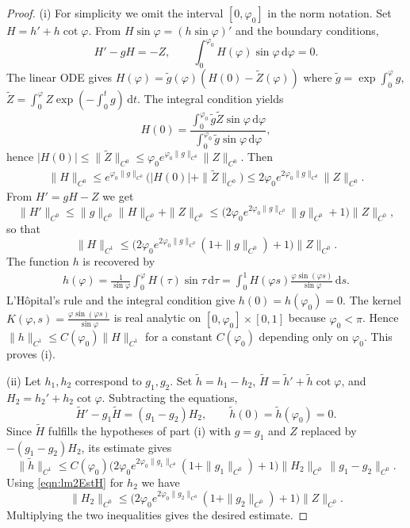 \documentclass{amsart}
\newcommand{\rmd}{\mathrm{d}}
\begin{document}
\begin{proof}
(i) For simplicity we omit the interval $[0,\varphi_0]$ in the norm notation.
Set $H = h' + h\cot\varphi$.  From $H\sin\varphi = (h\sin\varphi)'$ and the boundary conditions,
\[
H' - gH = -Z,\qquad \int_0^{\varphi_0} H(\varphi)\sin\varphi\,\mathrm{d}\varphi = 0.
\]
The linear ODE gives $H(\varphi) = \tilde g(\varphi)(H(0) - \tilde Z(\varphi))$ where
$\tilde g = \exp\int_0^\varphi g$, $\tilde Z = \int_0^\varphi Z\exp(-\int_0^t g)\,\rmd t$.
The integral condition yields
\[
H(0) = \frac{\int_0^{\varphi_0}\tilde g \tilde Z \sin\varphi\,\mathrm{d}\varphi}
            {\int_0^{\varphi_0}\tilde g \sin\varphi\,\mathrm{d}\varphi},
\]
hence $|H(0)| \le \|\tilde Z\|_{C^0} \le \varphi_0 e^{\varphi_0\|g\|_{C^0}}\|Z\|_{C^0}$.
Then
\begin{align}\label{eqn:lm2EstH}
\|H\|_{C^0} \le e^{\varphi_0\|g\|_{C^0}}\bigl(|H(0)|+\|\tilde Z\|_{C^0}\bigr)
          \le 2\varphi_0 e^{2\varphi_0\|g\|_{C^0}}\|Z\|_{C^0}.
\end{align}
From $H' = gH - Z$ we get
\[
\|H'\|_{C^0} \le \|g\|_{C^0}\|H\|_{C^0} + \|Z\|_{C^0}
\le \bigl(2\varphi_0 e^{2\varphi_0\|g\|_{C^0}}\|g\|_{C^0} + 1\bigr)\|Z\|_{C^0},
\]
so that
\[
\|H\|_{C^1} \le \bigl(2\varphi_0 e^{2\varphi_0\|g\|_{C^0}}(1+\|g\|_{C^0}) + 1\bigr)\|Z\|_{C^0}.
\]
The function $h$ is recovered by
\begin{align}\label{eqn:BVPKernel}
h(\varphi) = \frac{1}{\sin\varphi}\int_0^\varphi H(\tau)\sin\tau\,\rmd\tau
= \int_0^1 H(\varphi s)\frac{\varphi\sin(\varphi s)}{\sin\varphi}\,\rmd s.
\end{align}
L'H\^opital's rule and the integral condition give $h(0)=h(\varphi_0)=0$.
The kernel $K(\varphi,s)=\frac{\varphi\sin(\varphi s)}{\sin\varphi}$ is real analytic on $[0,\varphi_0]\times[0,1]$ because $\varphi_0<\pi$. Hence $\|h\|_{C^{1}}\le C(\varphi_{0})\|H\|_{C^{1}}$ for a constant $C(\varphi_{0})$ depending only on $\varphi_{0}$. This proves (i).

\noindent(ii) Let $h_1,h_2$ correspond to $g_1,g_2$.  Set $\tilde h = h_1-h_2$, $\tilde H = \tilde h'+\tilde h\cot\varphi$, and $H_2 = h_2'+h_2\cot\varphi$.  Subtracting the equations,
\[
\tilde H' - g_1\tilde H = (g_1-g_2)H_2,\qquad \tilde h(0)=\tilde h(\varphi_0)=0.
\]
Since $\tilde H$ fulfills the hypotheses of part (i) with $g=g_1$ and $Z$ replaced by $-(g_1-g_2)H_2$, its estimate gives
\[
\|\tilde h\|_{C^1} \le C(\varphi_0)\bigl(2\varphi_0 e^{2\varphi_0\|g_1\|_{C^0}}(1+\|g_1\|_{C^0}) + 1\bigr)
   \|H_2\|_{C^0}\,\|g_1-g_2\|_{C^0}.
\]
Using \eqref{eqn:lm2EstH} for $h_{2}$ we have
\[
\|H_2\|_{C^0} \le \bigl(2\varphi_0 e^{2\varphi_0\|g_2\|_{C^0}}(1+\|g_2\|_{C^0}) + 1\bigr)\|Z\|_{C^0}.
\]
Multiplying the two inequalities gives the desired estimate.
\end{proof}
\end{document}
